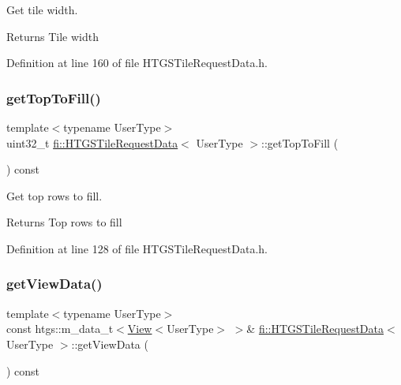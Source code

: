 Get tile width. 

\begin{DoxyReturn}{Returns}
Tile width 
\end{DoxyReturn}


Definition at line 160 of file H\+T\+G\+S\+Tile\+Request\+Data.\+h.

\mbox{\label{classfi_1_1HTGSTileRequestData_a05410cec078e3d5358b583e2e1fbb472}} 
\subsubsection{\texorpdfstring{get\+Top\+To\+Fill()}{getTopToFill()}}
{\footnotesize\ttfamily template$<$typename User\+Type$>$ \\
uint32\+\_\+t \hyperlink{classfi_1_1HTGSTileRequestData}{fi\+::\+H\+T\+G\+S\+Tile\+Request\+Data}$<$ User\+Type $>$\+::get\+Top\+To\+Fill (\begin{DoxyParamCaption}{ }\end{DoxyParamCaption}) const\hspace{0.3cm}{\ttfamily [inline]}}



Get top rows to fill. 

\begin{DoxyReturn}{Returns}
Top rows to fill 
\end{DoxyReturn}


Definition at line 128 of file H\+T\+G\+S\+Tile\+Request\+Data.\+h.

\mbox{\label{classfi_1_1HTGSTileRequestData_a48473c7a1136972c3026fb2df1545772}} 
\subsubsection{\texorpdfstring{get\+View\+Data()}{getViewData()}}
{\footnotesize\ttfamily template$<$typename User\+Type$>$ \\
const htgs\+::m\+\_\+data\+\_\+t$<$\hyperlink{classfi_1_1View}{View}$<$User\+Type$>$ $>$\& \hyperlink{classfi_1_1HTGSTileRequestData}{fi\+::\+H\+T\+G\+S\+Tile\+Request\+Data}$<$ User\+Type $>$\+::get\+View\+Data (\begin{DoxyParamCaption}{ }\end{DoxyParamCaption}) const\hspace{0.3cm}{\ttfamily [inline]}}



